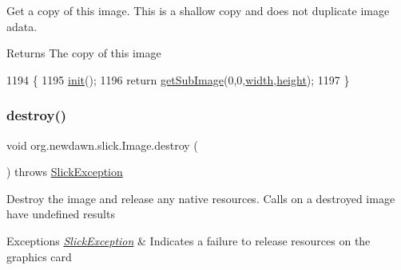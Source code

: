 Get a copy of this image. This is a shallow copy and does not duplicate image adata.

\begin{DoxyReturn}{Returns}
The copy of this image 
\end{DoxyReturn}

\begin{DoxyCode}
1194                         \{
1195         \mbox{\hyperlink{classorg_1_1newdawn_1_1slick_1_1_image_a94d180c9218ba1444a0496a1898ec345}{init}}();
1196         \textcolor{keywordflow}{return} \mbox{\hyperlink{classorg_1_1newdawn_1_1slick_1_1_image_a2ccb3bbdda674f9efdec614a54e31e32}{getSubImage}}(0,0,\mbox{\hyperlink{classorg_1_1newdawn_1_1slick_1_1_image_a7d02c85e21b388428cfe5cc5c82714a1}{width}},\mbox{\hyperlink{classorg_1_1newdawn_1_1slick_1_1_image_a54397a37823bc59ddc79ec70dc5cf226}{height}});
1197     \}
\end{DoxyCode}
\mbox{\label{classorg_1_1newdawn_1_1slick_1_1_image_a416abf7b7608e27ad903388f2b2bfb38}} 
\subsubsection{\texorpdfstring{destroy()}{destroy()}}
{\footnotesize\ttfamily void org.\+newdawn.\+slick.\+Image.\+destroy (\begin{DoxyParamCaption}{ }\end{DoxyParamCaption}) throws \mbox{\hyperlink{classorg_1_1newdawn_1_1slick_1_1_slick_exception}{Slick\+Exception}}\hspace{0.3cm}{\ttfamily [inline]}}

Destroy the image and release any native resources. Calls on a destroyed image have undefined results


\begin{DoxyExceptions}{Exceptions}
{\em \mbox{\hyperlink{classorg_1_1newdawn_1_1slick_1_1_slick_exception}{Slick\+Exception}}} & Indicates a failure to release resources on the graphics card \\
\hline
\end{DoxyExceptions}

